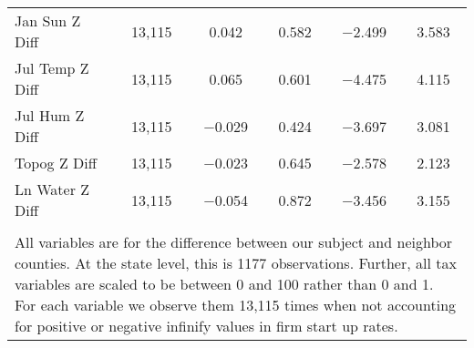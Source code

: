 \begin{table}[!htbp]
\begin{tabular}{@{\extracolsep{5pt}}lccccc}
Jan Sun Z Diff & 13,115 & 0.042 & 0.582 & $-$2.499 & 3.583 \\ 
Jul Temp Z Diff & 13,115 & 0.065 & 0.601 & $-$4.475 & 4.115 \\ 
Jul Hum Z Diff & 13,115 & $-$0.029 & 0.424 & $-$3.697 & 3.081 \\ 
Topog Z Diff & 13,115 & $-$0.023 & 0.645 & $-$2.578 & 2.123 \\ 
Ln Water Z Diff & 13,115 & $-$0.054 & 0.872 & $-$3.456 & 3.155 \\ 
\hline \\[-1.8ex] 
\multicolumn{6}{l}{All variables are for the difference between our subject and neighbor counties. At the state level, this is 1177 observations. Further, all tax variables are scaled to be between 0 and 100 rather than 0 and 1. For each variable we observe them 13,115 times when not accounting for positive or negative infinify values in firm start up rates.} \\ 
\end{tabular} 
\end{table} 
